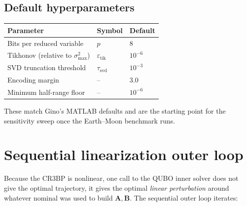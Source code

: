 \documentclass[8pt,a4paper]{article}
\newcommand{\bvec}[1]{\bm{#1}}
\newcommand{\Amat}{\bvec{A}}
\newcommand{\Bmat}{\bvec{B}}
\theoremstyle{definition}
\theoremstyle{remark}
\begin{document}
\subsection{Default hyperparameters}

\begin{center}
\begin{tabular}{lll}
  \toprule
  Parameter & Symbol & Default \\
  \midrule
  Bits per reduced variable        & $p$                     & $8$     \\
  Tikhonov (relative to $\sigma_{\max}^2$) & $\varepsilon_{\mathrm{tik}}$ & $10^{-6}$ \\
  SVD truncation threshold         & $\tau_{\mathrm{svd}}$   & $10^{-3}$ \\
  Encoding margin                  & --                      & $3.0$   \\
  Minimum half-range floor         & --                      & $10^{-6}$ \\
  \bottomrule
\end{tabular}
\end{center}

These match Gino's MATLAB defaults and are the starting point for
the sensitivity sweep once the Earth--Moon benchmark runs.

\section{Sequential linearization outer loop}\label{sec:sequential-linearization}

Because the CR3BP is nonlinear, one call to the QUBO inner solver
does not give the optimal trajectory, it gives the optimal
\emph{linear perturbation} around whatever nominal was used to build
$\Amat, \Bmat$. The sequential outer loop iterates:
\end{document}

